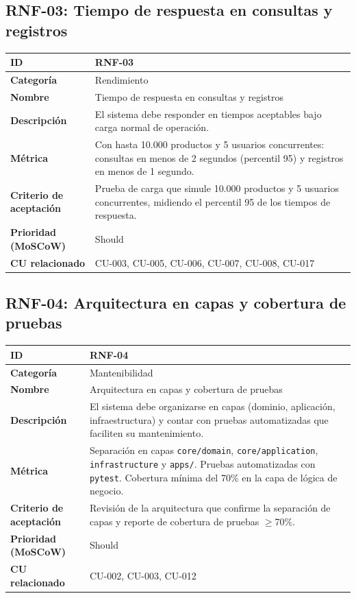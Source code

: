 \documentclass[12pt, a4paper]{article}
\begin{document}
\subsection{RNF-03: Tiempo de respuesta en consultas y registros}
\begin{center}
\renewcommand{\arraystretch}{1.4}
\begin{tabular}{|L{4cm}|L{12cm}|}
\hline
\textbf{ID} & RNF-03 \\
\hline
\textbf{Categoría} & Rendimiento \\
\hline
\textbf{Nombre} & Tiempo de respuesta en consultas y registros \\
\hline
\textbf{Descripción} & El sistema debe responder en tiempos aceptables bajo carga normal de operación. \\
\hline
\textbf{Métrica} & Con hasta 10.000 productos y 5 usuarios concurrentes: consultas en menos de 2 segundos (percentil 95) y registros en menos de 1 segundo. \\
\hline
\textbf{Criterio de aceptación} & Prueba de carga que simule 10.000 productos y 5 usuarios concurrentes, midiendo el percentil 95 de los tiempos de respuesta. \\
\hline
\textbf{Prioridad (MoSCoW)} & Should \\
\hline
\textbf{CU relacionado} & CU-003, CU-005, CU-006, CU-007, CU-008, CU-017 \\
\hline
\end{tabular}
\end{center}

\subsection{RNF-04: Arquitectura en capas y cobertura de pruebas}
\begin{center}
\renewcommand{\arraystretch}{1.4}
\begin{tabular}{|L{4cm}|L{12cm}|}
\hline
\textbf{ID} & RNF-04 \\
\hline
\textbf{Categoría} & Mantenibilidad \\
\hline
\textbf{Nombre} & Arquitectura en capas y cobertura de pruebas \\
\hline
\textbf{Descripción} & El sistema debe organizarse en capas (dominio, aplicación, infraestructura) y contar con pruebas automatizadas que faciliten su mantenimiento. \\
\hline
\textbf{Métrica} & Separación en capas \texttt{core/domain}, \texttt{core/application}, \texttt{infrastructure} y \texttt{apps/}. Pruebas automatizadas con \texttt{pytest}. Cobertura mínima del 70\% en la capa de lógica de negocio. \\
\hline
\textbf{Criterio de aceptación} & Revisión de la arquitectura que confirme la separación de capas y reporte de cobertura de pruebas $\geq$70\%. \\
\hline
\textbf{Prioridad (MoSCoW)} & Should \\
\hline
\textbf{CU relacionado} & CU-002, CU-003, CU-012 \\
\hline
\end{tabular}
\end{center}
\end{document}
